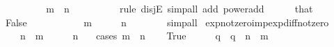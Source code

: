 \begin{isabellebody}
\ \ \ \ \isamarkupfalse%
\ \isamarkupfalse%
\ {\isacartoucheopen}{}\ {\isacharcircum}{\kern0pt}\ {\isacharparenleft}{\kern0pt}m\ {\isacharplus}{\kern0pt}\ n{\isacharparenright}{\kern0pt}\ {\isacharequal}{\kern0pt}\ {}{\isacartoucheclose}\isanewline
\ \ \ \ \ \ \isamarkupfalse%
\ {\isacharparenleft}{\kern0pt}rule\ disjE{\isacharparenright}{\kern0pt}\ {\isacharparenleft}{\kern0pt}simp{\isacharunderscore}{\kern0pt}all\ add{\isacharcolon}{\kern0pt}\ power{\isacharunderscore}{\kern0pt}add{\isacharparenright}{\kern0pt}\isanewline
\ \ \ \ \isamarkupfalse%
\ that\ \isamarkupfalse%
\ False\ \isacommand{{\isachardot}{\kern0pt}{\isachardot}{\kern0pt}}\isamarkupfalse%
\isanewline
\ \ \isamarkupfalse%
\isanewline
\ \ \isamarkupfalse%
\ \isamarkupfalse%
\ {\isacartoucheopen}{}\ {\isacharcircum}{\kern0pt}\ m\ {\isasymnoteq}\ {}{\isacartoucheclose}\ \ {\isacartoucheopen}{}\ {\isacharcircum}{\kern0pt}\ n\ {\isasymnoteq}\ {}{\isacartoucheclose}\isanewline
\ \ \ \ \isamarkupfalse%
\ simp{\isacharunderscore}{\kern0pt}all\isanewline
{}\isamarkupfalse%
%
\endisatagproof
{\isafoldproof}%
%
\isadelimproof
\isanewline
%
\endisadelimproof
\isanewline
{}\isamarkupfalse%
\ exp{\isacharunderscore}{\kern0pt}not{\isacharunderscore}{\kern0pt}zero{\isacharunderscore}{\kern0pt}imp{\isacharunderscore}{\kern0pt}exp{\isacharunderscore}{\kern0pt}diff{\isacharunderscore}{\kern0pt}not{\isacharunderscore}{\kern0pt}zero{\isacharcolon}{\kern0pt}\isanewline
\ \ {\isacartoucheopen}{}\ {\isacharcircum}{\kern0pt}\ {\isacharparenleft}{\kern0pt}n\ {\isacharminus}{\kern0pt}\ m{\isacharparenright}{\kern0pt}\ {\isasymnoteq}\ {}{\isacartoucheclose}\ \ {\isacartoucheopen}{}\ {\isacharcircum}{\kern0pt}\ n\ {\isasymnoteq}\ {}{\isacartoucheclose}\isanewline
%
\isadelimproof
%
\endisadelimproof
%
\isatagproof
{}\isamarkupfalse%
\ {\isacharparenleft}{\kern0pt}cases\ {\isacartoucheopen}m\ {\isasymle}\ n{\isacartoucheclose}{\isacharparenright}{\kern0pt}\isanewline
\ \ \isamarkupfalse%
\ True\isanewline
\ \ \isamarkupfalse%
\ \isamarkupfalse%
\ q\ \ {\isacartoucheopen}q\ {\isacharequal}{\kern0pt}\ n\ {\isacharminus}{\kern0pt}\ m{\isacartoucheclose}\isanewline
\ \ \isamarkupfalse%

\end{isabellebody}
